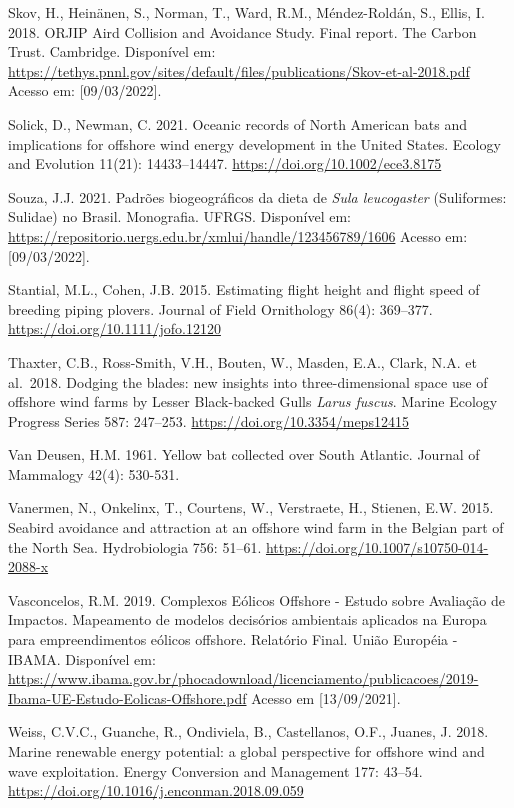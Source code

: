 \documentclass[
  oneside]{scrbook}
\begin{document}
Skov, H., Heinänen, S., Norman, T., Ward, R.M., Méndez-Roldán, S., Ellis, I. 2018. ORJIP Aird Collision and Avoidance Study. Final report. The Carbon Trust. Cambridge. Disponível em: \url{https://tethys.pnnl.gov/sites/default/files/publications/Skov-et-al-2018.pdf} Acesso em: {[}09/03/2022{]}.

Solick, D., Newman, C. 2021. Oceanic records of North American bats and implications for offshore wind energy development in the United States. Ecology and Evolution 11(21): 14433--14447. \url{https://doi.org/10.1002/ece3.8175}

Souza, J.J. 2021. Padrões biogeográficos da dieta de \emph{Sula leucogaster} (Suliformes: Sulidae) no Brasil. Monografia. UFRGS. Disponível em: \url{https://repositorio.uergs.edu.br/xmlui/handle/123456789/1606} Acesso em: {[}09/03/2022{]}.

Stantial, M.L., Cohen, J.B. 2015. Estimating flight height and flight speed of breeding piping plovers. Journal of Field Ornithology 86(4): 369--377. \url{https://doi.org/10.1111/jofo.12120}

Thaxter, C.B., Ross-Smith, V.H., Bouten, W., Masden, E.A., Clark, N.A. et al.~2018. Dodging the blades: new insights into three-dimensional space use of offshore wind farms by Lesser Black-backed Gulls \emph{Larus fuscus}. Marine Ecology Progress Series 587: 247--253. \url{https://doi.org/10.3354/meps12415}

Van Deusen, H.M. 1961. Yellow bat collected over South Atlantic. Journal of Mammalogy 42(4): 530-531.

Vanermen, N., Onkelinx, T., Courtens, W., Verstraete, H., Stienen, E.W. 2015. Seabird avoidance and attraction at an offshore wind farm in the Belgian part of the North Sea. Hydrobiologia 756: 51--61. \url{https://doi.org/10.1007/s10750-014-2088-x}

Vasconcelos, R.M. 2019. Complexos Eólicos Offshore - Estudo sobre Avaliação de Impactos. Mapeamento de modelos decisórios ambientais aplicados na Europa para empreendimentos eólicos offshore. Relatório Final. União Européia - IBAMA. Disponível em: \url{https://www.ibama.gov.br/phocadownload/licenciamento/publicacoes/2019-Ibama-UE-Estudo-Eolicas-Offshore.pdf} Acesso em {[}13/09/2021{]}.

Weiss, C.V.C., Guanche, R., Ondiviela, B., Castellanos, O.F., Juanes, J. 2018. Marine renewable energy potential: a global perspective for offshore wind and wave exploitation. Energy Conversion and Management 177: 43--54. \url{https://doi.org/10.1016/j.enconman.2018.09.059}
\end{document}
